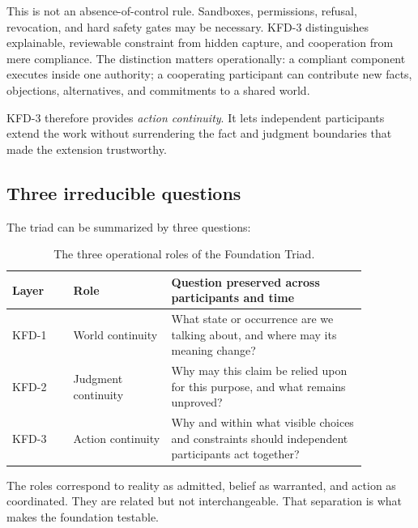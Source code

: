 This is not an absence-of-control rule. Sandboxes, permissions, refusal,
revocation, and hard safety gates may be necessary. KFD-3 distinguishes
explainable, reviewable constraint from hidden capture, and cooperation from
mere compliance. The distinction matters operationally: a compliant component
executes inside one authority; a cooperating participant can contribute new
facts, objections, alternatives, and commitments to a shared world.

KFD-3 therefore provides \emph{action continuity}. It lets independent
participants extend the work without surrendering the fact and judgment
boundaries that made the extension trustworthy.

\subsection{Three irreducible questions}

The triad can be summarized by three questions:

\begin{table}[ht]
\centering
\small
\begin{tabular}{p{0.15\linewidth}p{0.24\linewidth}p{0.48\linewidth}}
\toprule
Layer & Role & Question preserved across participants and time \\
\midrule
KFD-1 & World continuity & What state or occurrence are we talking about, and
where may its meaning change? \\
KFD-2 & Judgment continuity & Why may this claim be relied upon for this
purpose, and what remains unproved? \\
KFD-3 & Action continuity & Why and within what visible choices and constraints
should independent participants act together? \\
\bottomrule
\end{tabular}
\caption{The three operational roles of the Foundation Triad.}
\label{tab:triad-roles}
\end{table}

The roles correspond to reality as admitted, belief as warranted, and action
as coordinated. They are related but not interchangeable. That separation is
what makes the foundation testable.

